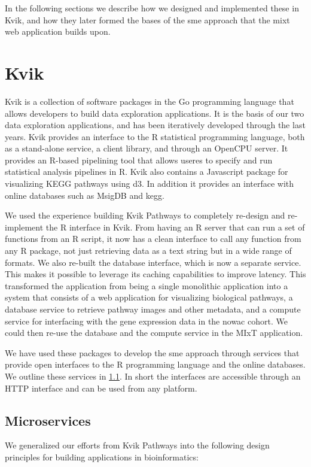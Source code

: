 In the following sections we describe how we designed and implemented these in
Kvik, and how they later formed the bases of the \gls{sme} approach
that the \gls{mixt} web application builds upon. 

\section{Kvik}\label{kviksec}
Kvik is a collection of software packages in the Go programming language that
allows developers to build data exploration applications. It is the basis of our
two data exploration applications, and has been iteratively developed through
the last years. Kvik provides an interface to the R statistical programming
language, both as a stand-alone service, a client library, and through an
OpenCPU server. It provides an R-based pipelining tool that allows useres to
specify and run statistical analysis pipelines in R.  Kvik also contains a
Javascript package for visualizing KEGG pathways using d3.\cite{d3}  In addition
it provides an interface with online databases such as MsigDB\cite{msigdb} and
\gls{kegg}\cite{kegg}. 

We used the experience building Kvik Pathways to completely re-design and
re-implement the R interface in Kvik. From having an R server that can run a
set of functions from an R script, it now has a clean interface to call any
function from any R package, not just retrieving data as a text string but in a
wide range of formats. We also re-built the database interface, which is now a
separate service. This makes it possible to leverage its caching capabilities
to improve latency. This transformed the application from being a single
monolithic application into a system that consists of a web application for
visualizing biological pathways, a database service to retrieve pathway images
and other metadata, and a compute service for interfacing with the gene
expression data in the \gls{nowac} cohort. We could then re-use the database and the
compute service in the MIxT application. 

We have used these packages to develop the \gls{sme} approach through services
that provide open interfaces to the R programming language and the online
databases.  We outline these services in \ref{micrservices}.  In short the
interfaces are accessible through an HTTP interface and can be used from any
platform.

\subsection{Microservices}\label{micrservices} 
We generalized our efforts from Kvik Pathways into the following design
principles for building applications in bioinformatics: 

